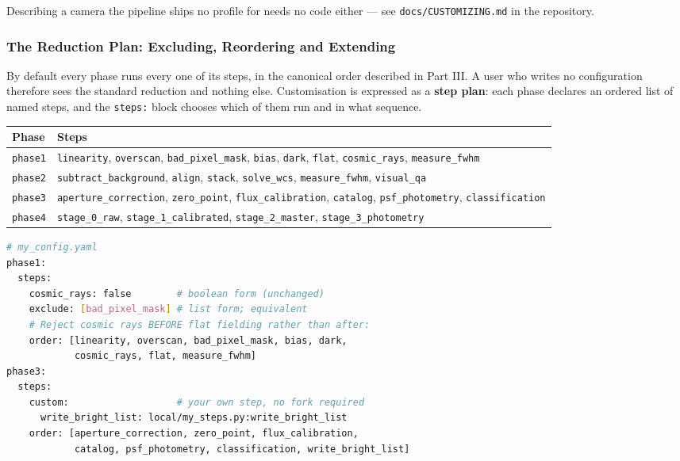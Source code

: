 \documentclass[11pt,a4paper]{article}
\begin{document}
\begin{sloppypar}
Describing a camera the pipeline ships no profile for needs no code either ---
see \texttt{docs/CUSTOMIZING.md} in the repository.
\end{sloppypar}

\subsubsection{The Reduction Plan: Excluding, Reordering and Extending}
\label{sec:stepplan}
By default every phase runs every one of its steps, in the canonical order
described in Part III. A user who writes no configuration therefore sees the
standard reduction and nothing else. Customisation is expressed as a
\textbf{step plan}: each phase declares an ordered list of named steps, and the
\texttt{steps:} block chooses which of them run and in what sequence.

\begin{center}
\begin{tabularx}{\textwidth}{|l|X|}
\hline
\textbf{Phase} & \textbf{Steps} \\
\hline
\texttt{phase1} & \texttt{linearity}, \texttt{overscan}, \texttt{bad\_pixel\_mask}, \texttt{bias}, \texttt{dark}, \texttt{flat}, \texttt{cosmic\_rays}, \texttt{measure\_fwhm} \\
\hline
\texttt{phase2} & \texttt{subtract\_background}, \texttt{align}, \texttt{stack}, \texttt{solve\_wcs}, \texttt{measure\_fwhm}, \texttt{visual\_qa} \\
\hline
\texttt{phase3} & \texttt{aperture\_correction}, \texttt{zero\_point}, \texttt{flux\_calibration}, \texttt{catalog}, \texttt{psf\_photometry}, \texttt{classification} \\
\hline
\texttt{phase4} & \texttt{stage\_0\_raw}, \texttt{stage\_1\_calibrated}, \texttt{stage\_2\_master}, \texttt{stage\_3\_photometry} \\
\hline
\end{tabularx}
\end{center}

\begin{lstlisting}[language=bash]
# my_config.yaml
phase1:
  steps:
    cosmic_rays: false        # boolean form (unchanged)
    exclude: [bad_pixel_mask] # list form; equivalent
    # Reject cosmic rays BEFORE flat fielding rather than after:
    order: [linearity, overscan, bad_pixel_mask, bias, dark,
            cosmic_rays, flat, measure_fwhm]
phase3:
  steps:
    custom:                   # your own step, no fork required
      write_bright_list: local/my_steps.py:write_bright_list
    order: [aperture_correction, zero_point, flux_calibration,
            catalog, psf_photometry, classification, write_bright_list]
\end{lstlisting}
\end{document}
